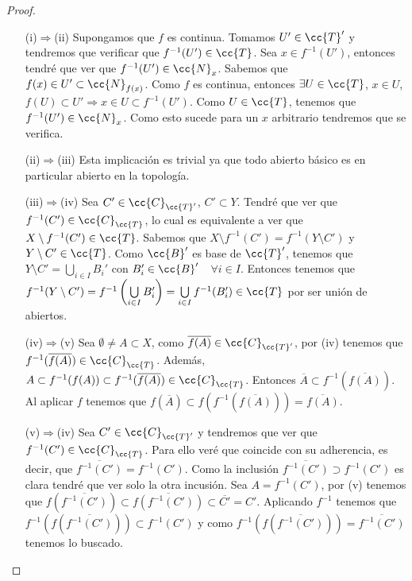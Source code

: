 \begin{prop}
    \begin{proof}\
        \begin{enumerate}
            \item[(i)$\Rightarrow$(ii)] Supongamos que $f$ es continua. Tomamos $U' \in \cc{T}'$ y tendremos que verificar que $f^{-1}(U')\in \cc{T}$. Sea $x \in f^{-1}(U')$, entonces tendré que ver que $f^{-1}(U')\in \cc{N}_x$. Sabemos que $f(x)\in U' \subset \cc{N}_{f(x)}$. Como $f$ es continua, entonces $\exists U\in \cc{T} $, $x\in U$, $f(U)\subset U' \Rightarrow x \in U \subset f^{-1}(U')$. Como $U\in \cc{T}$, tenemos que $f^{-1}(U')\in \cc{N}_x$. Como esto sucede para un $x$ arbitrario tendremos que se verifica.
            \item[(ii)$\Rightarrow$(iii)] Esta implicación es trivial ya que todo abierto básico es en particular abierto en la topología.
            \item[(iii)$\Rightarrow$(iv)] Sea $C' \in \cc{C}_{\cc{T}'}$, $C'\subset Y$. Tendré que ver que $f^{-1}(C')\in \cc{C}_{\cc{T}}$, lo cual es equivalente a ver que $X \setminus f^{-1}(C')\in \cc{T}$. Sabemos que $X\setminus f^{-1}(C') = f^{-1}(Y\setminus C')$ y $Y\setminus C'\in \cc{T}$. Como $\cc{B}'$ es base de $\cc{T}'$, tenemos que $Y\setminus C'=\bigcup\limits_{i\in I} B_i'$ con $B_i'\in \cc{B}'$\ \ $\forall i \in I$. Entonces tenemos que $f^{-1}(Y\setminus C') = f^{-1}\left(\bigcup\limits_{i\in I}B_i'\right) = \bigcup\limits_{i\in I}f^{-1}(B_i')\in \cc{T}$ por ser unión de abiertos.
            \item[(iv)$\Rightarrow$(v)] Sea $\emptyset \neq A \subset X$, como $\overline{f(A)}\in \cc{C}_{\cc{T}'}$, por (iv) tenemos que $f^{-1}(\overline{f(A)})\in \cc{C}_{\cc{T}}$. Además, $A \subset f^{-1}(f(A))\subset f^{-1}(\overline{f(A)})\in \cc{C}_{\cc{T}}$. Entonces $\overline{A}\subset f^{-1}(\overline{f(A)})$. Al aplicar $f$ tenemos que $f(\overline{A})\subset f(f^{-1}(\overline{f(A)}))=\overline{f(A)}$.
            \item[(v)$\Rightarrow$(iv)] Sea $C' \in \cc{C}_{\cc{T}'}$ y tendremos que ver que $f^{-1}(C')\in \cc{C}_{\cc{T}}$. Para ello veré que coincide con su adherencia, es decir, que $\overline{f^{-1}(C')} = f^{-1}(C')$. Como la inclusión $\overline{f^{-1}(C')} \supset f^{-1}(C')$ es clara tendré que ver solo la otra incusión. Sea $A=f^{-1}(C')$, por (v) tenemos que $f(\overline{f^{-1}(C')})\subset \overline{f(f^{-1}(C'))} \subset \overline{C'}=C'$. Aplicando $f^{-1}$ tenemos que $f^{-1}(f(\overline{f^{-1}(C')}))\subset f^{-1}(C')$ y como $f^{-1}(f(\overline{f^{-1}(C')})) = \overline{f^{-1}(C')}$ tenemos lo buscado.

\end{enumerate}
\end{proof}
\end{prop}
